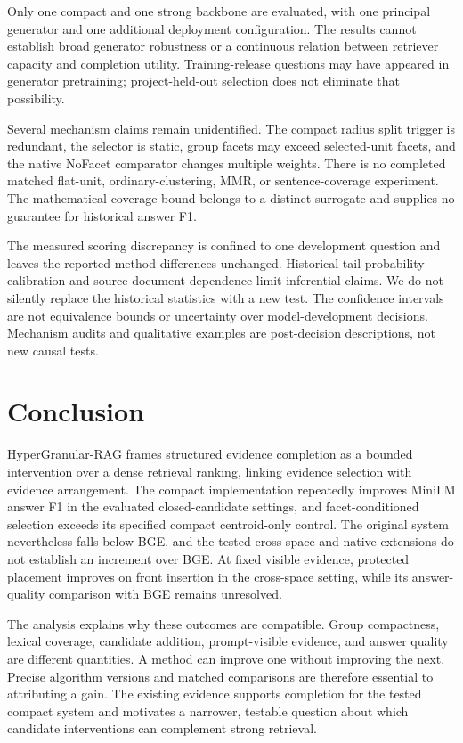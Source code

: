 \documentclass[11pt,a4paper]{article}
\newcommand{\hgrag}{HyperGranular-RAG\xspace}
\begin{document}
Only one compact and one strong backbone are evaluated, with one principal
generator and one additional deployment configuration. The results cannot
establish broad generator robustness or a continuous relation between
retriever capacity and completion utility. Training-release questions may
have appeared in generator pretraining; project-held-out selection does not
eliminate that possibility.

Several mechanism claims remain unidentified. The compact radius split
trigger is redundant, the selector is static, group facets may exceed
selected-unit facets, and the native NoFacet comparator changes multiple
weights. There is no completed matched flat-unit, ordinary-clustering,
MMR, or sentence-coverage experiment. The mathematical coverage bound
belongs to a distinct surrogate and supplies no guarantee for historical
answer F1.

The measured scoring discrepancy is confined to one development question
and leaves the reported method differences unchanged. Historical
tail-probability calibration and source-document
dependence limit inferential claims. We do not silently replace the
historical statistics with a new test. The confidence intervals are not
equivalence bounds or uncertainty over model-development decisions.
Mechanism audits and qualitative examples are post-decision descriptions,
not new causal tests.

\section{Conclusion}
\hgrag frames structured evidence completion as a bounded intervention over
a dense retrieval ranking, linking evidence selection with evidence
arrangement. The compact implementation repeatedly
improves MiniLM answer F1 in the evaluated closed-candidate settings, and
facet-conditioned selection exceeds its specified compact centroid-only
control. The original system nevertheless falls below BGE, and the tested
cross-space and native extensions do not establish an increment over BGE.
At fixed visible evidence, protected placement improves on front insertion
in the cross-space setting, while its answer-quality comparison with BGE
remains unresolved.

The analysis explains why these outcomes are compatible. Group compactness,
lexical coverage, candidate addition, prompt-visible evidence, and answer
quality are different quantities. A method can improve one without
improving the next. Precise algorithm versions and matched comparisons are
therefore essential to attributing a gain. The existing evidence supports
completion for the tested compact system and motivates a narrower,
testable question about which candidate interventions can complement strong
retrieval.
\end{document}
